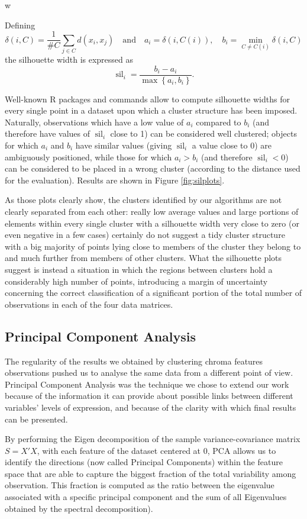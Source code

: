 w\documentclass[11pt, oneside]{article}
\DeclareMathOperator{\silhouette}{sil}
\begin{document}
Defining
\[
\delta\left(i,C\right)=\frac{1}{\# C}\sum_{j\in C}d\left(x_i, x_j\right) \quad
\mathrm{and} \quad a_i=\delta\left(i,C\left(i\right)\right), \quad b_i = \min_{C\neq C\left(i\right)} \delta\left(i,C\right)
\]
the silhouette width is expressed as
\[
\silhouette_i = \frac{b_i - a_i}{\max\left\{a_i, b_i\right\}}.
\]


Well-known R packages and commands allow to compute silhouette widths for every single point in a dataset upon which a cluster structure has been imposed. Naturally, observations which have a low value of $a_i$ compared to $b_i$ (and therefore have values of $\silhouette_i$ close to \num{1}) can be considered well clustered; objects for which $a_i$ and $b_i$ have similar values (giving $\silhouette_i$ a value close to \num{0}) are ambiguously positioned, while those for which $a_i > b_i$ (and therefore $\silhouette_i <0$) can be considered to be placed in a wrong cluster (according to the distance used for the evaluation). Results are shown in Figure \ref{fig:silplots}.

As those plots clearly show, the clusters identified by our algorithms are not clearly separated from each other: really low average values and large portions of elements within every single cluster with a silhouette width very close to zero (or even negative in a few cases) certainly do not suggest a tidy cluster structure with a big majority of points lying close to members of the cluster they belong to and much further from members of other clusters. What the silhouette plots suggest is instead a situation in which the regions between clusters hold a considerably high number of points, introducing a margin of uncertainty concerning the correct classification of a significant portion of the total number of observations in each of the four data matrices.
\newpage
\subsection{Principal Component Analysis}
The regularity of the results we obtained by clustering chroma features observations pushed us to analyse the same data from a different point of view. Principal Component Analysis was the technique we chose to extend our work because of the information it can provide about possible links between different variables’ levels of expression, and because of the clarity with which final results can be presented.

By performing the Eigen decomposition of the sample variance-covariance matrix $S=X'X$, with each feature of the dataset centered at 0, PCA allows us to identify the directions (now called Principal Components) within the feature space that are able to capture the biggest fraction of the total variability among observation. This fraction is computed as the ratio between the eigenvalue associated with a specific principal component and the sum of all Eigenvalues obtained by the spectral decomposition).
\end{document}
